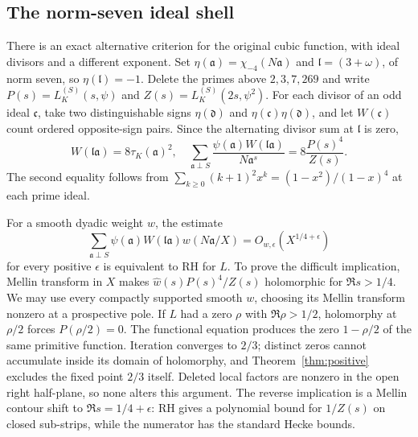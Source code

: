 \documentclass[11pt]{article}
\begin{document}
\subsection{The norm-seven ideal shell}
There is an exact alternative criterion for the original cubic function, with ideal divisors and a different exponent. Set $\eta(\mathfrak a)=\chi_{-4}(N\mathfrak a)$ and $\mathfrak l=(3+\omega)$, of norm seven, so $\eta(\mathfrak l)=-1$. Delete the primes above $2,3,7,269$ and write $P(s)=L_K^{(S)}(s,\psi)$ and $Z(s)=L_K^{(S)}(2s,\psi^2)$. For each divisor of an odd ideal $\mathfrak c$, take two distinguishable signs $\eta(\mathfrak d)$ and $\eta(\mathfrak c)\eta(\mathfrak d)$, and let $W(\mathfrak c)$ count ordered opposite-sign pairs. Since the alternating divisor sum at $\mathfrak l$ is zero,
\[
 W(\mathfrak l\mathfrak a)=8\tau_K(\mathfrak a)^2,
 \quad
 \sum_{\mathfrak a\perp S}\frac{\psi(\mathfrak a)W(\mathfrak l\mathfrak a)}{N\mathfrak a^s}
        =8\frac{P(s)^4}{Z(s)}.
 \tag{8.8}
\]
The second equality follows from $\sum_{k\ge0}(k+1)^2x^k=(1-x^2)/(1-x)^4$ at each prime ideal.

For a smooth dyadic weight $w$, the estimate
\[
 \sum_{\mathfrak a\perp S}\psi(\mathfrak a)W(\mathfrak l\mathfrak a)
          w(N\mathfrak a/X)=O_{w,\epsilon}(X^{1/4+\epsilon})
 \tag{8.9}
\]
for every positive $\epsilon$ is equivalent to RH for $L$. To prove the difficult implication, Mellin transform in $X$ makes $\widehat w(s)P(s)^4/Z(s)$ holomorphic for $\Re s>1/4$. We may use every compactly supported smooth $w$, choosing its Mellin transform nonzero at a prospective pole. If $L$ had a zero $\rho$ with $\Re\rho>1/2$, holomorphy at $\rho/2$ forces $P(\rho/2)=0$. The functional equation produces the zero $1-\rho/2$ of the same primitive function. Iteration converges to $2/3$; distinct zeros cannot accumulate inside its domain of holomorphy, and Theorem~\ref{thm:positive} excludes the fixed point $2/3$ itself. Deleted local factors are nonzero in the open right half-plane, so none alters this argument. The reverse implication is a Mellin contour shift to $\Re s=1/4+\epsilon$: RH gives a polynomial bound for $1/Z(s)$ on closed sub-strips, while the numerator has the standard Hecke bounds.
\end{document}
